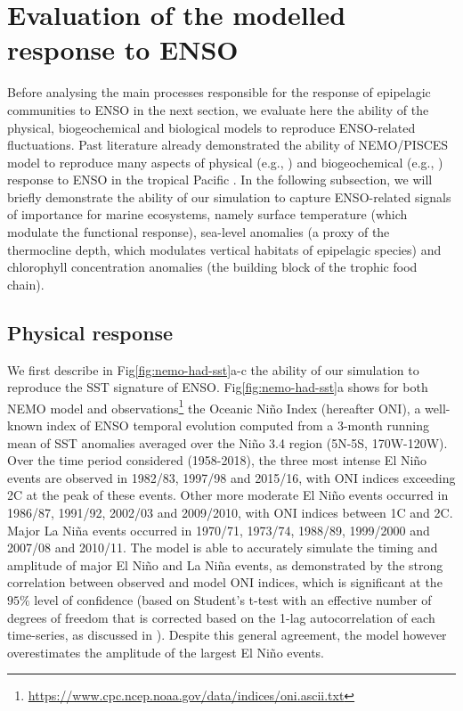 \section{Evaluation of the modelled response to ENSO}

Before analysing the main processes responsible for the response of epipelagic communities to ENSO in the next section, we evaluate here the ability of the physical, biogeochemical and biological models to reproduce ENSO-related fluctuations. Past literature already demonstrated the ability of NEMO/PISCES model to reproduce many aspects of physical (e.g., \citealt{vialardModelStudyOceanic2001, lengaigneOceanResponseMarch2002}) and biogeochemical (e.g., \citealt{ masottiLargescaleShiftsPhytoplankton2011}) response to ENSO in the tropical Pacific . In the following subsection, we will briefly demonstrate the ability of our simulation to capture ENSO-related signals of importance for marine ecosystems, namely surface temperature (which modulate the functional response), sea-level anomalies (a proxy of the thermocline depth, which modulates vertical habitats of epipelagic species) and chlorophyll concentration anomalies (the building block of the trophic food chain). 

\subsection{Physical response}

We first describe in Fig\ref{fig:nemo-had-sst}a-c the ability of our simulation to reproduce the SST signature of ENSO. Fig\ref{fig:nemo-had-sst}a shows for both NEMO model and observations\footnote{\url{https://www.cpc.ncep.noaa.gov/data/indices/oni.ascii.txt}} the Oceanic Niño Index (hereafter ONI), a well-known index of ENSO temporal evolution computed from a 3-month running mean of SST anomalies averaged over the Niño 3.4 region (5N-5S, 170W-120W). Over the time period considered (1958-2018), the three most intense El Niño events are observed in 1982/83, 1997/98 and 2015/16, with ONI indices exceeding 2\degree{}C at the peak of these events. Other more moderate El Niño events occurred in 1986/87, 1991/92, 2002/03 and 2009/2010, with ONI indices between 1\degree{}C and 2\degree{}C. Major La Niña events occurred in 1970/71, 1973/74, 1988/89, 1999/2000 and 2007/08 and 2010/11. The model is able to accurately simulate the timing and amplitude of major El Niño and La Niña events, as demonstrated by the strong correlation between observed and model ONI indices, which is significant at the $95\%$ level of confidence (based on Student's t-test with an effective number of degrees of freedom that is corrected based on the 1-lag autocorrelation of each time-series, as discussed in \cite{brethertonEffectiveNumberSpatial1999}). Despite this general agreement, the model however overestimates the amplitude of the largest El Niño events. 

